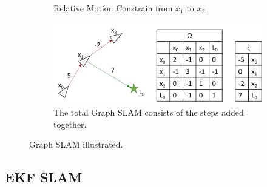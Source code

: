 \begin{figure}[H]
\begin{subfigure}{.5\textwidth}
  \caption{Relative Motion Constrain from $x_1$ to $x_2$}
  \label{SLAM_fig04:sub4}
\end{subfigure}
\begin{subfigure}{.5\textwidth}
  \centering
  \includegraphics[width=.8\linewidth]{billeder/GraphSLAM04_5.png}
  \caption{The total Graph SLAM consists of the steps added together.}
  \label{SLAM_fig04:sub5}
\end{subfigure}
\caption{Graph SLAM illustrated.}
\label{SLAM_fig04}
\end{figure}

\subsection{EKF SLAM}

